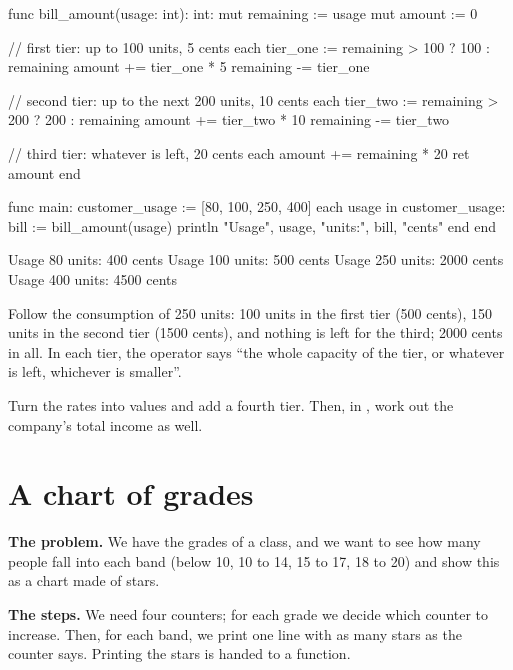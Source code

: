 \begin{salamcode}
func bill_amount(usage: int): int:
    mut remaining := usage
    mut amount := 0

    // first tier: up to 100 units, 5 cents each
    tier_one := remaining > 100 ? 100 : remaining
    amount += tier_one * 5
    remaining -= tier_one

    // second tier: up to the next 200 units, 10 cents each
    tier_two := remaining > 200 ? 200 : remaining
    amount += tier_two * 10
    remaining -= tier_two

    // third tier: whatever is left, 20 cents each
    amount += remaining * 20
    ret amount
end

func main:
    customer_usage := [80, 100, 250, 400]
    each usage in customer_usage:
        bill := bill_amount(usage)
        println "Usage", usage, "units:", bill, "cents"
    end
end
\end{salamcode}

\begin{salamout}
Usage 80 units: 400 cents
Usage 100 units: 500 cents
Usage 250 units: 2000 cents
Usage 400 units: 4500 cents
\end{salamout}

Follow the consumption of 250 units: 100 units in the first tier (500
cents), 150 units in the second tier (1500 cents), and nothing is left for
the third; 2000 cents in all. In each tier, the  operator says
``the whole capacity of the tier, or whatever is left, whichever is
smaller''.

\begin{tip}
Turn the rates into  values and add a fourth tier. Then, in
, work out the company's total income as well.
\end{tip}

\section{A chart of grades}

\textbf{The problem.} We have the grades of a class, and we want to see how
many people fall into each band (below 10, 10 to 14, 15 to 17, 18 to 20) and
show this as a chart made of stars.

\textbf{The steps.} We need four counters; for each grade we decide which
counter to increase. Then, for each band, we print one line with as many
stars as the counter says. Printing the stars is handed to a function.

